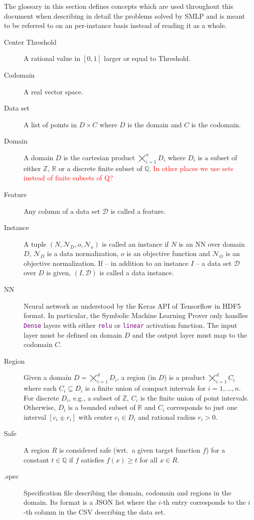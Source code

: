\documentclass[a4paper,parskip=half]{article} %
\newcommand*\cmdstyle\texttt
\newcommand*\api[1]{\textcolor{purple}{\cmdstyle{#1}}}
\newcommand*\Solver{Symbolic Machine Learning Prover\xspace}
\newcommand*\SolverAbbrvText{SMLP}
\newcommand*\SolverAbbrv{\SolverAbbrvText\xspace}
\newcommand\todozk[1]{\textcolor{red}{#1}}
\newcommand*\ZK{\todozk}
\begin{document}
The glossary in this section defines concepts which are used throughout this
document when describing in detail the problems solved by \SolverAbbrv and is
meant to be referred to on an per-instance basis instead of reading it as a
whole.
\begin{description}
\item[Center Threshold]
	A rational value in $[0,1]$ larger or equal to Threshold.
\item[Codomain]
	A real vector space.
\item[Data set]
	A list of points in $D\times C$ where $D$ is the domain and $C$ is the
	codomain.
\item[Domain]
	A domain $D$ is the cartesian product $\bigtimes_{i=1}^n D_i$ where
	$D_i$ is a subset of either $\mathbb Z$, $\mathbb R$ or a
	discrete finite subset of $\mathbb Q$. \ZK{In other places we use sets instead of finite subsets of Q?}
\item[Feature]
	Any column of a data set $\mathcal D$ is called a feature.
\item[Instance]
	A tuple
	$(N,\mathcal N_D,o,\mathcal N_o)$ is called an instance if
	$N$ is an NN over domain $D$, $\mathcal N_D$ is a data normalization,
	$o$ is an objective function and
	$\mathcal N_O$ is an objective normalization.
	If -- in addition to an instance $I$ -- a data set $\mathcal D$ over $D$
	is given, $(I,\mathcal D)$ is called a data instance.
\item[NN]
	Neural network as understood by the Keras API of Tensorflow in HDF5
	format.
	In particular, the \Solver only handles \api{Dense} layers with either
	\api{relu} or \api{linear} activation function.
	The input layer must be defined on domain $D$ and the output layer
	must map to the codomain $C$.
\item[Region]
	Given a domain $D=\bigtimes_{i=1}^d D_i$, a region (in $D$) is a
	product $\bigtimes_{i=1}^d C_i$ where
	each $C_i\subseteq D_i$ is a finite union of compact intervals for
	$i=1,\ldots,n$.
	For discrete $D_i$, e.g., a subset of $\mathbb Z$,
	$C_i$ is the finite union of point intervals.
	Otherwise, $D_i$ is a bounded subset of $\mathbb R$ and $C_i$
	corresponds to just one interval $[c_i\pm r_i]$ with center $c_i\in D_i$
	and rational radius $r_i>0$.
\item[Safe]
	A region $R$ is considered safe (wrt.\ a given target function $f$) for a
	constant $t\in\mathbb Q$ if $f$ satisfies $f(x)\geq t$
	for all $x\in R$.
\item[.spec]
	Specification file describing the domain, codomain and regions in the
	domain. Its format is a JSON list where the $i$-th entry corresponds to
	the $i$-th column in the CSV describing the data set.


\end{description}
\end{document}

